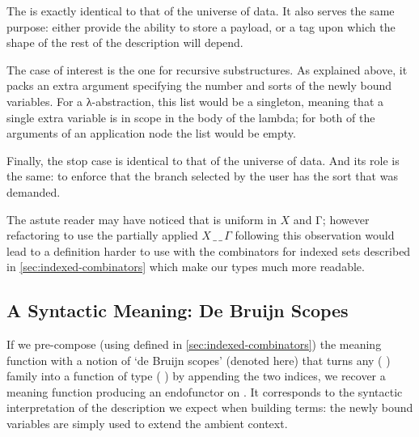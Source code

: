The  is exactly identical to that of the universe of data. It
also serves the same purpose: either provide the ability to store a
payload, or a tag upon which the shape of the rest of the description
will depend.

\begin{AgdaSuppressSpace}
\end{AgdaSuppressSpace}

The case of interest is the one for recursive substructures. As explained
above, it packs an extra argument specifying the number and sorts of the
newly bound variables. For a λ-abstraction, this list would be a singleton,
meaning that a single extra variable is in scope in the body of the lambda;
for both of the arguments of an application node the list would be empty.

\begin{AgdaSuppressSpace}
\end{AgdaSuppressSpace}

Finally, the stop case is identical to that of the universe of data.
And its role is the same: to enforce that the branch selected by the
user has the sort that was demanded.

\begin{AgdaSuppressSpace}
\end{AgdaSuppressSpace}

The astute reader may have noticed that  is uniform in $X$
and Γ; however refactoring  to use the partially applied
$X\,\_\,\_\,\Gamma$ following this observation would lead to
a definition harder to use with the combinators for indexed sets
described in \cref{sec:indexed-combinators} which make our types
much more readable.


\subsection{A Syntactic Meaning: De Bruijn Scopes}

If we pre-compose (using  defined in \cref{sec:indexed-combinators})
the meaning function  with a notion of
`de Bruijn scopes' (denoted  here) that turns any
{( )} family into a function
of type {(    )} by appending the two
 indices, we recover a meaning function producing an endofunctor on
 . It corresponds to the syntactic interpretation of
the description we expect when building terms: the newly bound variables
are simply used to extend the ambient context.

